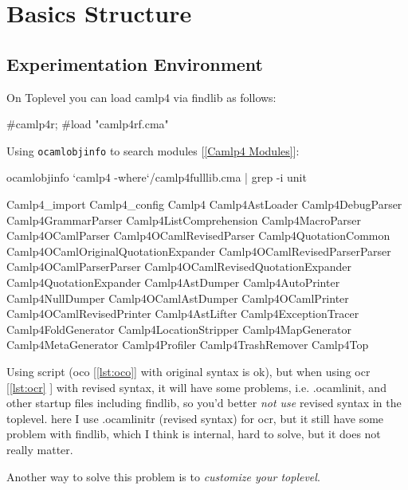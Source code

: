 \section{Basics Structure}

\subsection{Experimentation Environment}

On Toplevel  you can load camlp4 via  findlib as follows:

\begin{ocamlcode}
#camlp4r;
#load "camlp4rf.cma"
\end{ocamlcode}
Using \verb|ocamlobjinfo| to search modules [\ref{Camlp4 Modules}]:     

\begin{bashcode}
ocamlobjinfo `camlp4 -where`/camlp4fulllib.cma | grep -i unit
\end{bashcode}

\begin{bluetext}
 Camlp4_import Camlp4_config Camlp4 Camlp4AstLoader Camlp4DebugParser
 Camlp4GrammarParser Camlp4ListComprehension Camlp4MacroParser
 Camlp4OCamlParser Camlp4OCamlRevisedParser Camlp4QuotationCommon
 Camlp4OCamlOriginalQuotationExpander Camlp4OCamlRevisedParserParser
 Camlp4OCamlParserParser Camlp4OCamlRevisedQuotationExpander
 Camlp4QuotationExpander Camlp4AstDumper Camlp4AutoPrinter
 Camlp4NullDumper Camlp4OCamlAstDumper Camlp4OCamlPrinter
 Camlp4OCamlRevisedPrinter Camlp4AstLifter Camlp4ExceptionTracer
 Camlp4FoldGenerator Camlp4LocationStripper Camlp4MapGenerator
 Camlp4MetaGenerator Camlp4Profiler Camlp4TrashRemover Camlp4Top
\end{bluetext}

Using script (oco [\ref{lst:oco}] with original syntax is ok), but
when using ocr [\ref{lst:ocr} ] with revised syntax, it will have
some problems, i.e. .ocamlinit, and other startup files including
findlib, so you'd better \textit{not use} revised syntax in the
toplevel. here I use .ocamlinitr (revised syntax) for ocr, but it
still have some problem with findlib, which I think is internal, hard
to solve, but it does not really matter.


Another way to solve this problem is to \textit{customize your toplevel}.



